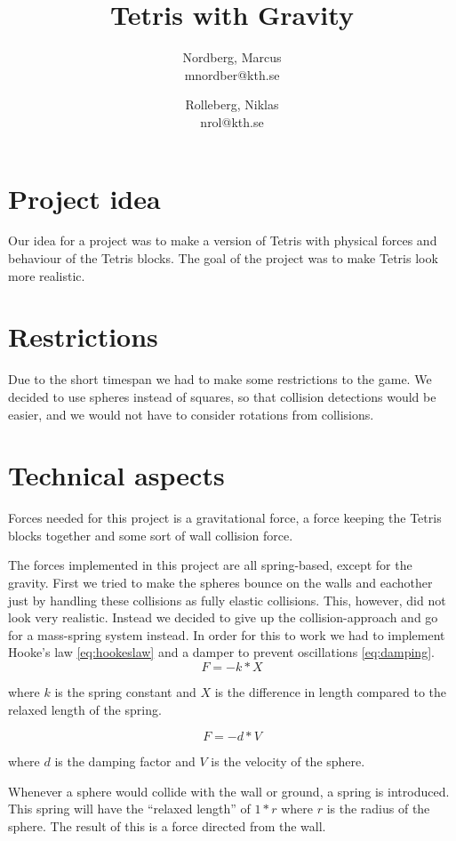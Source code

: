 \documentclass[11pt]{article} %
\title{Tetris with Gravity}
\author{Nordberg, Marcus \\ mnordber@kth.se
		\and
	Rolleberg, Niklas \\ nrol@kth.se}
\begin{document}
\maketitle

\section{Project idea}
Our idea for a project was to make a version of Tetris with physical forces and behaviour of the Tetris blocks. The goal of the project was to make Tetris look more realistic. 

\section{Restrictions}
Due to the short timespan we had to make some restrictions to the game. We decided to use spheres instead of squares, so that collision detections would be easier, and we would not have to consider rotations from collisions.

\section{Technical aspects}
Forces needed for this project is a gravitational force, a force keeping the Tetris blocks together and some sort of wall collision force.

The forces implemented in this project are all spring-based, except for the gravity. First we tried to make the spheres bounce on the walls and eachother just by handling these collisions as fully elastic collisions. This, however, did not look very realistic. Instead we decided to give up the collision-approach and go for a mass-spring system instead. In order for this to work we had to implement Hooke's law \eqref{eq:hookeslaw} and a damper to prevent oscillations \eqref{eq:damping}.
\begin{equation}
	\label{eq:hookeslaw}
       F = -k*X
\end{equation}

where $k$ is the spring constant and $X$ is the difference in length compared to the relaxed length of the spring.

\begin{equation}
	\label{eq:damping}
       F = -d*V
\end{equation}

where $d$ is the damping factor and $V$ is the velocity of the sphere.

Whenever a sphere would collide with the wall or ground, a spring is introduced. This spring will have the ``relaxed length'' of $1 * r$ where $r$ is the radius of the sphere. The result of this is a force directed from the wall.
\end{document}
